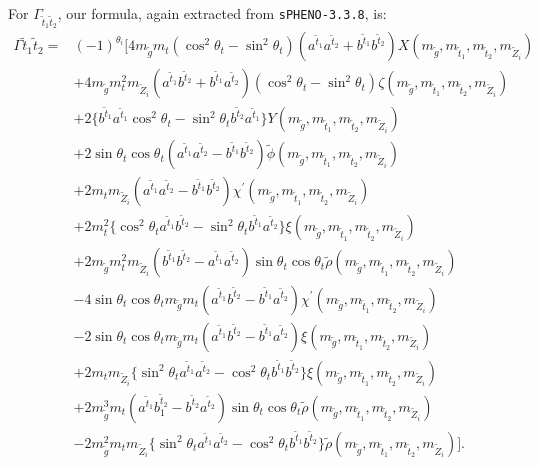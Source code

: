 \documentclass[final,3p,times,pdflatex]{elsarticle}
\begin{document}
For $\Gamma_{\tilde{t}_1 \tilde{t}_2}$, our formula, again extracted from {\tt sPHENO-3.3.8}, is:
\begin{equation}
\begin{aligned}
\Gamma{\tilde{t}_{1} \tilde{t}_2} = & (-1)^{\theta_i}\Big[4m_{\tilde{g}}m_{t}(\cos^2 \theta_t - \sin^2 \theta_t)(a^{\tilde{t}_1} a^{\tilde{t}_2} + b^{\tilde{t}_1} b^{\tilde{t}_2})X(m_{\tilde{g}},m_{\tilde{t}_1}, m_{\tilde{t}_2}, m_{\tilde{Z}_i}) \\ & + 4m_{\tilde{g}}m_{t}^2 m_{\tilde{Z}_i}(a^{\tilde{t}_1} b^{\tilde{t}_2} + b^{\tilde{t}_1}a^{\tilde{t}_2})(\cos^2 \theta_t - \sin^2 \theta_t)\zeta (m_{\tilde{g}},m_{\tilde{t}_1}, m_{\tilde{t}_2}, m_{\tilde{Z}_i}) \\ & + 2 \{b^{\tilde{t}_1}a^{\tilde{t}_1}\cos^2 \theta_t - \sin^2 \theta_t b^{\tilde{t}_2}a^{\tilde{t}_1} \}Y (m_{\tilde{g}},m_{\tilde{t}_1}, m_{\tilde{t}_2}, m_{\tilde{Z}_i}) \\ & + 2\sin\theta_t \cos\theta_t (a^{\tilde{t}_1} a^{\tilde{t}_2} - b^{\tilde{t}_1}b^{\tilde{t}_2}) \tilde{\phi} (m_{\tilde{g}},m_{\tilde{t}_1}, m_{\tilde{t}_2}, m_{\tilde{Z}_i}) \\ & + 2m_{t}m_{\tilde{Z}_i}(a^{\tilde{t}_1}a^{\tilde{t}_2} - b^{\tilde{t}_1}b^{\tilde{t}_2})\chi^{'} (m_{\tilde{g}},m_{\tilde{t}_1}, m_{\tilde{t}_2}, m_{\tilde{Z}_i}) \\ & + 2 m_{t}^2 \{\cos^2 \theta_t a^{\tilde{t}_1} b^{\tilde{t}_2} - \sin^2 \theta_t b^{\tilde{t}_1}a^{\tilde{t}_2}\}\xi (m_{\tilde{g}},m_{\tilde{t}_1}, m_{\tilde{t}_2}, m_{\tilde{Z}_i}) \\ & + 2m_{\tilde{g}}m_{t}^2 m_{\tilde{Z}_{i}}(b^{\tilde{t}_1} b^{\tilde{t}_2}-a^{\tilde{t}_1} a^{\tilde{t}_2})\sin\theta_t \cos\theta_t \tilde{\rho} (m_{\tilde{g}},m_{\tilde{t}_1}, m_{\tilde{t}_2}, m_{\tilde{Z}_i}) \\ & - 4\sin\theta_t \cos\theta_t m_{\tilde{g}}m_{t}(a^{\tilde{t}_1}b^{\tilde{t}_2}-b^{\tilde{t}_1}a^{\tilde{t}_2})\chi^{'} (m_{\tilde{g}},m_{\tilde{t}_1}, m_{\tilde{t}_2}, m_{\tilde{Z}_i}) \\ & - 2\sin\theta_t \cos\theta_t m_{\tilde{g}}m_{t}(a^{\tilde{t}_1} b^{\tilde{t}_2} - b^{\tilde{t}_1} a^{\tilde{t}_2}) \xi (m_{\tilde{g}},m_{\tilde{t}_1}, m_{\tilde{t}_2}, m_{\tilde{Z}_i}) \\ & + 2m_{t} m_{\tilde{Z}_i}\{\sin^2 \theta_t a^{\tilde{t}_1} a^{\tilde{t}_2} - \cos^2 \theta_t b^{\tilde{t}_1} b^{\tilde{t}_2}\} \xi (m_{\tilde{g}},m_{\tilde{t}_1}, m_{\tilde{t}_2}, m_{\tilde{Z}_i}) \\ & + 2 m_{\tilde{g}}^3 m_{t}(a^{\tilde{t}_1} b_{1}^{\tilde{t}_2} - b^{\tilde{t}_2} a^{\tilde{t}_2})\sin\theta_{t} \cos\theta_t \tilde{\rho} (m_{\tilde{g}},m_{\tilde{t}_1}, m_{\tilde{t}_2}, m_{\tilde{Z}_i}) \\ & - 2 m_{\tilde{g}}^2 m_{t} m_{\tilde{Z}_{i}}\{\sin^2 \theta_t a^{\tilde{t}_1} a^{\tilde{t}_2} - \cos^2 \theta_t b^{\tilde{t}_1}b^{\tilde{t}_2}\} \tilde{\rho} (m_{\tilde{g}},m_{\tilde{t}_1}, m_{\tilde{t}_2}, m_{\tilde{Z}_i})\Big].
\end{aligned}
\end{equation}
\end{document}
